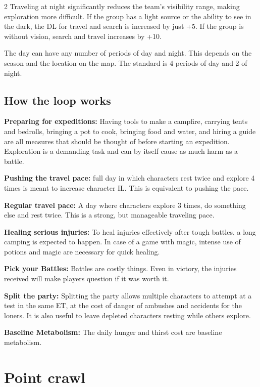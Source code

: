 \begin{multicols}{2}
Traveling at night significantly reduces the team's visibility range, making exploration more difficult. If the group has a light source or the ability to see in the dark, the DL for travel and search is increased by just +5. If the group is without vision, search and travel increases by +10.

The day can have any number of periods of day and night. This depends on the season and the location on the map. The standard is 4 periods of day and 2 of night.

\subsection{ How the loop works }

\textbf{Preparing for expeditions:} Having tools to make a campfire, carrying tents and bedrolls, bringing a pot to cook, bringing food and water, and hiring a guide are all measures that should be thought of before starting an expedition. Exploration is a demanding task and can by itself cause as much harm as a battle.

\textbf{Pushing the travel pace:} full day in which characters rest twice and explore 4 times is meant to increase character IL. This is equivalent to pushing the pace.

\textbf{Regular travel pace:} A day where characters explore 3 times, do something else and rest twice. This is a strong, but manageable traveling pace.

\textbf{Healing serious injuries:} To heal injuries effectively after tough battles, a long camping is expected to happen. In case of a game with magic, intense use of potions and magic are necessary for quick healing. 

\textbf{Pick your Battles:} Battles are costly things. Even in victory, the injuries received will make players question if it was worth it.

\textbf{Split the party:} Splitting the party allows multiple characters to attempt at a test in the same ET, at the cost of danger of ambushes and accidents for the loners. It is also useful to leave depleted characters resting while others explore. 

\textbf{Baseline Metabolism:} The daily hunger and thirst cost are baseline metabolism.

\section{ Point crawl}



\end{multicols}
